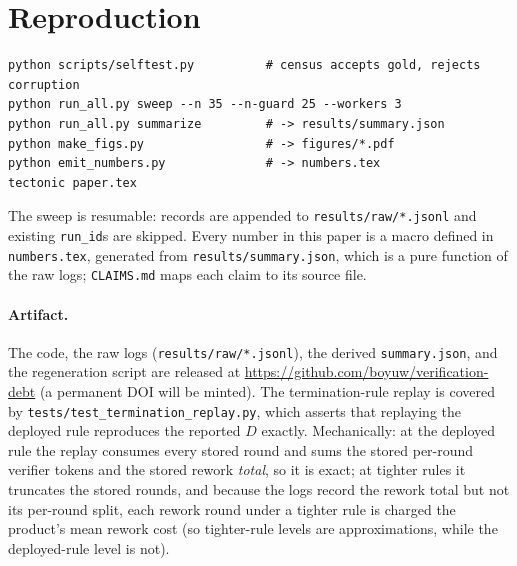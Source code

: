 \documentclass[11pt]{article}
\newcommand{\D}{\ensuremath{D}}
\begin{document}
\section{Reproduction}
\label{app:repro}

\begin{verbatim}
python scripts/selftest.py          # census accepts gold, rejects corruption
python run_all.py sweep --n 35 --n-guard 25 --workers 3
python run_all.py summarize         # -> results/summary.json
python make_figs.py                 # -> figures/*.pdf
python emit_numbers.py              # -> numbers.tex
tectonic paper.tex
\end{verbatim}

The sweep is resumable: records are appended to \texttt{results/raw/*.jsonl} and existing
\texttt{run\_id}s are skipped. Every number in this paper is a macro defined in
\texttt{numbers.tex}, generated from \texttt{results/summary.json}, which is a pure function of
the raw logs; \texttt{CLAIMS.md} maps each claim to its source file.

\begin{sloppypar}
\paragraph{Artifact.} The code, the raw logs (\texttt{results/raw/*.jsonl}), the derived
\texttt{summary.json}, and the regeneration script are released at
\url{https://github.com/boyuw/verification-debt} (a permanent DOI will be
minted). The termination-rule replay is covered by \texttt{tests/test\_termination\_replay.py}, which
asserts that replaying the deployed rule reproduces the reported $\D$ exactly. Mechanically: at the
deployed rule the replay consumes every stored round and sums the stored per-round verifier tokens
and the stored rework \emph{total}, so it is exact; at tighter rules it truncates the stored rounds,
and because the logs record the rework total but not its per-round split, each rework round under a
tighter rule is charged the product's mean rework cost (so tighter-rule levels are approximations,
while the deployed-rule level is not).
\end{sloppypar}
\end{document}
